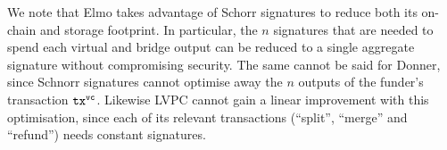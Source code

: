   We note that Elmo takes advantage of Schorr signatures to reduce both its
  on-chain and storage footprint. In particular, the $n$ signatures that are
  needed to spend each virtual and bridge output can be reduced to a single
  aggregate signature without compromising security. The same cannot be said for
  Donner, since Schnorr signatures cannot optimise away the $n$ outputs of the
  funder's transaction $\texttt{tx}^{\mathtt{vc}}$. Likewise LVPC cannot gain a linear
  improvement with this optimisation, since each of its relevant transactions
  (``split'', ``merge'' and ``refund'') needs constant signatures.
